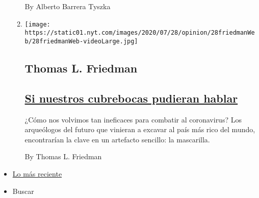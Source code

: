 \begin{enumerate}
\begin{enumerate}
    By Alberto Barrera Tyszka
  \item
    \texttt{[image: https://static01.nyt.com/images/2020/07/28/opinion/28friedmanWeb/28friedmanWeb-videoLarge.jpg]}

    \hypertarget{thomas-l-friedman}{%
    \subsection{Thomas L. Friedman}\label{thomas-l-friedman}}

    \hypertarget{si-nuestros-cubrebocas-pudieran-hablar}{%
    \subsection{\texorpdfstring{\href{/es/2020/07/30/espanol/opinion/usar-cubrebocas-politica.html}{Si
    nuestros cubrebocas pudieran
    hablar}}{Si nuestros cubrebocas pudieran hablar}}\label{si-nuestros-cubrebocas-pudieran-hablar}}

    ¿Cómo nos volvimos tan ineficaces para combatir al coronavirus? Los
    arqueólogos del futuro que vinieran a excavar al país más rico del
    mundo, encontrarían la clave en un artefacto sencillo: la
    mascarilla.

    By Thomas L. Friedman
  \end{enumerate}
\end{enumerate}

\begin{itemize}
\tightlist
\item
  \protect\hyperlink{stream-panel}{Lo más reciente}
\item
  Buscar
\end{itemize}

